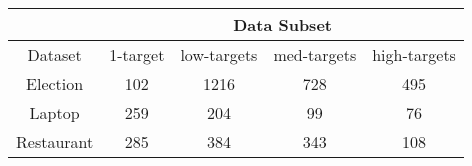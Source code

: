 \begin{tabular}{|c|c|c|c|c|}
\hline
        & \multicolumn{4}{c|}{Data Subset} \\
\hline
Dataset &  1-target &  low-targets &   med-targets &   high-targets \\
\hline
Election   &       102 &        1216    &          728 &           495 \\
\hline
Laptop     &       259 &        204     &           99 &            76 \\
\hline
Restaurant &       285 &        384    &           343 &           108 \\
\hline
\end{tabular}
